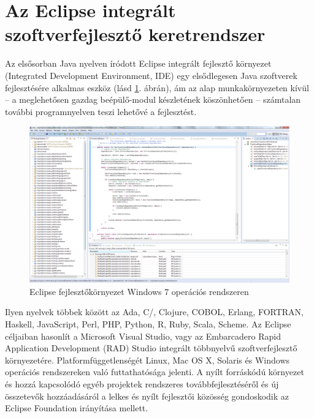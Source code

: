 
\section{Az Eclipse integrált szoftverfejlesztő keretrendszer}

Az elsősorban Java nyelven íródott Eclipse integrált fejlesztő környezet (Integrated Development Environment, IDE) egy elsődlegesen Java szoftverek fejlesztésére alkalmas eszköz (lásd \ref{fig:EclipseIDE}. ábrán), ám az alap munkakörnyezeten kívül -- a meglehetősen gazdag beépülő-modul készletének köszönhetően -- számtalan további programnyelven teszi lehetővé a fejlesztést.
%
\begin{figure}[hbt]
\centering
\includegraphics[width=\textwidth]{figures/eclipse-ide.png}
\caption{Eclipse fejlesztőkörnyezet Windows 7 operációs rendszeren}
\label{fig:EclipseIDE}
\end{figure}
%
Ilyen nyelvek többek között az Ada, C/\CPP, Clojure, COBOL, Erlang, FORTRAN, Haskell, JavaScript, Perl, PHP, Python, R, Ruby, Scala, Scheme.
Az Eclipse céljaiban hasonlít a Microsoft Visual Studio, vagy az Embarcadero Rapid Application Development (RAD) Studio integrált többnyelvű szoftverfejlesztő környezetére.
Platformfüggetlenségét Linux, Mac OS X, Solaris és Windows operációs rendszereken való futtathatósága jelenti.
A nyílt forráskódú környezet és hozzá kapcsolódó egyéb projektek rendszeres továbbfejlesztéséről és új összetevők hozzáadásáról a lelkes és nyílt fejlesztői közösség  gondoskodik az Eclipse Foundation irányítása mellett.

